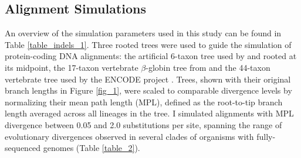 \subsection{Alignment Simulations}

An overview of the simulation parameters used in this study can be
found in Table \ref{table_indels_1}. Three rooted trees were used to
guide the simulation of protein-coding DNA alignments: the artificial
6-taxon tree used by \citet{Anisimova2001} and
\citet{Massingham2005} rooted at its midpoint, the 17-taxon
vertebrate $\beta$-globin tree from \citet{Yang2000CodonSubstitution}
and the 44-taxon vertebrate tree used by the ENCODE project
\citep{Birney2007,Nikolaev2007}. Trees, shown with their original
branch lengths in Figure \ref{fig_1}, were scaled to comparable
divergence levels by normalizing their mean path length (MPL), defined
as the root-to-tip branch length averaged across all lineages in the
tree. I simulated alignments with MPL divergence between 0.05 and 2.0
\syn substitutions per \syn site, spanning the range of evolutionary
divergences observed in several clades of organisms with
fully-sequenced genomes (Table \ref{table_2}).

